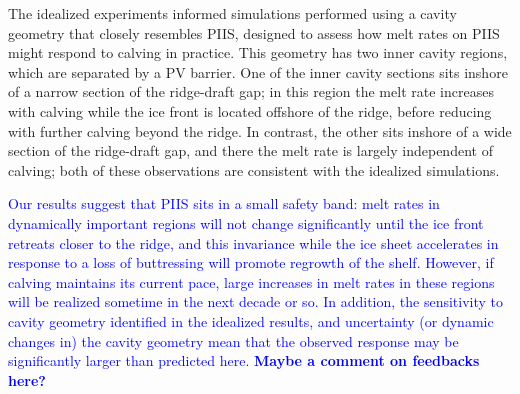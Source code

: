 \documentclass[draft]{agujournal2019}
\newcommand{\blue}[1]{\textcolor{blue}{#1}}
\begin{document}
The idealized experiments informed simulations performed using a cavity geometry that closely resembles PIIS, designed to assess how melt rates on PIIS might respond to calving in practice. This geometry has two inner cavity regions, which are separated by a PV barrier. One of the inner cavity sections sits inshore of a narrow section of the ridge-draft gap; in this region the melt rate increases with calving while the ice front is located offshore of the ridge, before reducing with further calving beyond the ridge. In contrast, the other sits inshore of a wide section of the ridge-draft gap, and there the melt rate is largely independent of calving; both of these observations are consistent with the idealized simulations. %

\blue{Our results suggest that PIIS sits in a small safety band: melt rates in dynamically important regions will not change significantly until the ice front retreats closer to the ridge, and this invariance while the ice sheet accelerates in response to a loss of buttressing will promote regrowth of the shelf. However, if calving maintains its current pace, large increases in melt rates in these regions will be realized sometime in the next decade or so. In addition, the sensitivity to cavity geometry identified in the idealized results, and uncertainty (or dynamic changes in) the cavity geometry mean that the observed response may be significantly larger than predicted here.  \textbf{Maybe a comment on feedbacks here?}}


\end{document}
